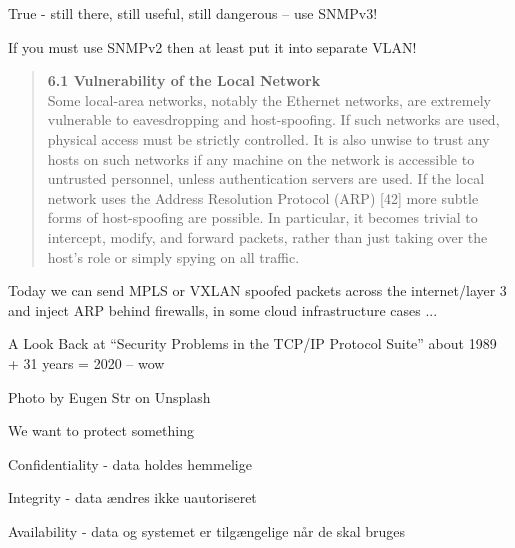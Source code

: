 \documentclass[Screen16to9,17pt]{foils}
\begin{document}
True - still there, still useful, still dangerous -- use SNMPv3!

If you must use SNMPv2 then at least put it into separate VLAN! {\myalert}


\begin{quote}
{\bf 6.1 Vulnerability of the Local Network}\\
Some local-area networks, notably the Ethernet networks, are extremely vulnerable to eavesdropping and host-spoofing. If such networks are used, physical access must be strictly controlled. It is also unwise to trust any hosts on such networks if any machine on the network is accessible to untrusted personnel, unless authentication servers are used.
If the local network uses the Address Resolution Protocol (ARP) [42] more subtle forms of host-spoofing are possible. In particular, it becomes trivial to intercept, modify, and forward packets, rather than just taking over the host’s role or simply spying on all traffic.
\end{quote}

Today we can send MPLS or VXLAN spoofed packets across the internet/layer 3 and inject ARP behind firewalls, in some cloud infrastructure cases ...\\
{\footnotesize{}}

A Look Back at “Security Problems in the TCP/IP Protocol Suite”
about 1989 + 31 years = 2020 -- wow






\hfill Photo by Eugen Str on Unsplash




\begin{list1}
\item We want to protect something
\item Confidentiality - data holdes hemmelige
\item Integrity - data ændres ikke uautoriseret
\item Availability - data og systemet er tilgængelige når de skal bruges
\end{list1}
\end{document}
